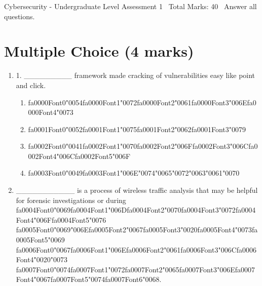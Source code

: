 \documentclass[12pt]{article}
\begin{document}
\begin{center}
Cybersecurity - Undergraduate Level Assessment 1 \
Total Marks: 40 \
Answer all questions.
\end{center}

\section*{Multiple Choice (4 marks)}
\begin{enumerate}[label=\arabic*.]
\item 1. \_\_\_\_\_\_\_\_\_ framework made cracking of vulnerabilities easy like point and click.
\begin{enumerate}[label=(\alph*)]
    \item {\csname fa0000Font0\endcsname\char"0054}{\csname fa0000Font1\endcsname\char"0072}{\csname fa0000Font2\endcsname\char"0061}{\csname fa0000Font3\endcsname\char"006E}{\csname fa0000Font4\endcsname\char"0073}
    \item {\csname fa0001Font0\endcsname\char"0052}{\csname fa0001Font1\endcsname\char"0075}{\csname fa0001Font2\endcsname\char"0062}{\csname fa0001Font3\endcsname\char"0079}
    \item {\csname fa0002Font0\endcsname\char"0041}{\csname fa0002Font1\endcsname\char"0070}{\csname fa0002Font2\endcsname\char"006F}{\csname fa0002Font3\endcsname\char"006C}{\csname fa0002Font4\endcsname\char"006C}{\csname fa0002Font5\endcsname\char"006F}
    \item {\csname fa0003Font0\endcsname\char"0049}{\csname fa0003Font1\endcsname\char"006E}{\char"0074}{\char"0065}{\char"0072}{\char"0063}{\char"0061}{\char"0070}
\end{enumerate}
\item \_\_\_\_\_\_\_\_\_\_\_ is a process of wireless traffic analysis that may be helpful for forensic investigations or during {\csname fa0004Font0\endcsname\char"0069}{\csname fa0004Font1\endcsname\char"006D}{\csname fa0004Font2\endcsname\char"0070}{\csname fa0004Font3\endcsname\char"0072}{\csname fa0004Font4\endcsname\char"006F}{\csname fa0004Font5\endcsname\char"0076} {\csname fa0005Font0\endcsname\char"0069}{\char"006E}{\csname fa0005Font2\endcsname\char"0067}{\csname fa0005Font3\endcsname\char"0020}{\csname fa0005Font4\endcsname\char"0073}{\csname fa0005Font5\endcsname\char"0069} {\csname fa0006Font0\endcsname\char"0067}{\csname fa0006Font1\endcsname\char"006E}{\csname fa0006Font2\endcsname\char"0061}{\csname fa0006Font3\endcsname\char"006C}{\csname fa0006Font4\endcsname\char"0020}{\char"0073} {\csname fa0007Font0\endcsname\char"0074}{\csname fa0007Font1\endcsname\char"0072}{\csname fa0007Font2\endcsname\char"0065}{\csname fa0007Font3\endcsname\char"006E}{\csname fa0007Font4\endcsname\char"0067}{\csname fa0007Font5\endcsname\char"0074}{\csname fa0007Font6\endcsname\char"0068}.

\end{enumerate}
\end{document}

